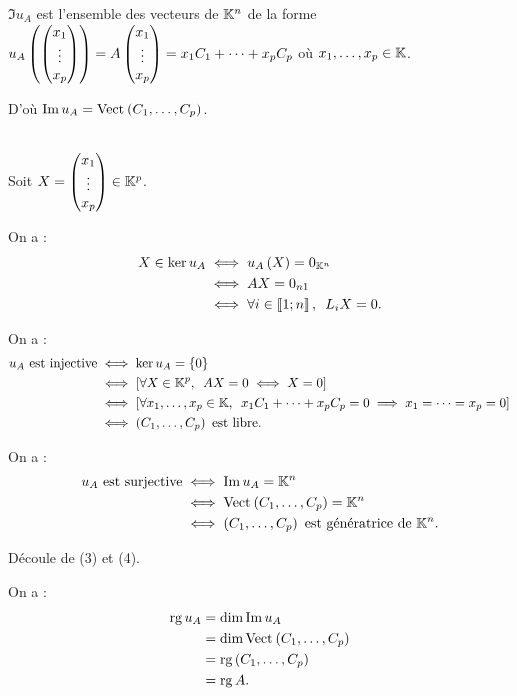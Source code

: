 \begin{dem}[1]
\(\Im u_A\) est l'ensemble des vecteurs de \(\mathbb{K}^n\) de la forme \(u_A\left(\begin{pmatrix}x_1\\\vdots\\x_p\end{pmatrix}\right)=A\begin{pmatrix}x_1\\\vdots\\x_p\end{pmatrix}=x_1C_1+\dots+x_pC_p\) où \(x_1,\dots,x_p\in\mathbb{K}\).

D'où \(\Im u_A=\Vect{C_1,\dots,C_p}\).
\end{dem}

\begin{dem}[2]~\\
Soit \(X=\begin{pmatrix}x_1\\\vdots\\x_p\end{pmatrix}\in\mathbb{K}^p\).

On a : \[\begin{aligned}
X\in\ker u_A&\ssi u_A\paren{X}=0_{\K^n} \\
&\ssi AX=0_{n1} \\
&\ssi\quantifs{\forall i\in\interventierii{1}{n}}L_iX=0.
\end{aligned}\]
\end{dem}

\begin{dem}
On a : \[\begin{aligned}
u_A\text{ est injective}&\ssi\ker u_A=\accol{0} \\
&\ssi\croch{\quantifs{\forall X\in\K^p}AX=0\ssi X=0} \\
&\ssi\croch{\quantifs{\forall x_1,\dots,x_p\in\K}x_1C_1+\dots+x_pC_p=0\imp x_1=\dots=x_p=0} \\
&\ssi\paren{C_1,\dots,C_p}\text{ est libre}.
\end{aligned}\]
\end{dem}

\begin{dem}[4]
On a : \[\begin{aligned}
u_A\text{ est surjective}&\ssi\Im u_A=\K^n \\
&\ssi\Vect{C_1,\dots,C_p}=\K^n \\
&\ssi\paren{C_1,\dots,C_p}\text{ est génératrice de }\K^n.
\end{aligned}\]
\end{dem}

\begin{dem}[5]
Découle de (3) et (4).
\end{dem}

\begin{dem}[6]
On a : \[\begin{aligned}
\rg u_A&=\dim\Im u_A \\
&=\dim\Vect{C_1,\dots,C_p} \\
&=\rg\paren{C_1,\dots,C_p} \\
&=\rg A.
\end{aligned}\]
\end{dem}

